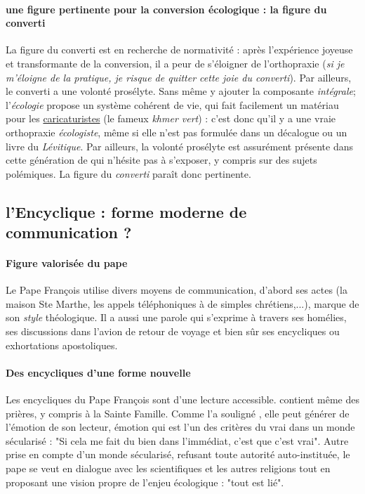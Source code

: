 \paragraph{une figure pertinente pour la conversion écologique : la figure du converti} La figure du converti \cite{hervieu-leger_pelerin_2001} est en recherche de normativité : après l'expérience joyeuse et transformante de la conversion, il a peur de s'éloigner de l'orthopraxie (\textit{si je m'éloigne de la pratique, je risque de quitter cette joie du converti}). Par ailleurs, le converti a une volonté prosélyte. Sans même y ajouter la composante \textit{intégrale}; l'\textit{écologie} propose un système cohérent de vie,  qui fait facilement un matériau  pour les \href{https://www.youtube.com/watch?v=RhFp_K8oTgc}{caricaturistes} (le fameux \textit{khmer vert}) : c'est donc qu'il y a une vraie orthopraxie \textit{écologiste}, même si elle n'est pas formulée dans un décalogue ou un livre du \textit{Lévitique}. Par ailleurs, la volonté prosélyte est assurément présente dans cette génération de \RLimite qui n'hésite pas à s'exposer, y compris sur des sujets polémiques. La figure du \textit{converti} paraît donc pertinente.  


\subsection{l'Encyclique : forme moderne de communication ? }

\paragraph{Figure valorisée du pape} Le Pape François utilise divers moyens de communication, d'abord ses actes (la maison Ste Marthe, les appels téléphoniques à de simples chrétiens,...), marque de son \textit{style} théologique. Il a aussi une parole qui s'exprime à travers ses homélies, ses discussions dans l'avion de retour de voyage et bien sûr ses encycliques ou exhortations apostoliques.

\paragraph{Des encycliques d'une forme nouvelle} Les encycliques du Pape François sont d'une lecture accessible. \LS contient même des prières, y compris à la Sainte Famille. Comme l'a souligné \cite{revol_reception_2017}, elle peut générer de l'émotion de son lecteur, émotion qui est l'un des critères du vrai dans un monde sécularisé : "Si cela me fait du bien dans l'immédiat, c'est que c'est vrai". Autre prise en compte d'un monde sécularisé, refusant toute autorité auto-instituée, le pape se veut en dialogue avec les scientifiques et les autres religions tout en proposant une vision propre de l'enjeu écologique : "tout est lié". 

